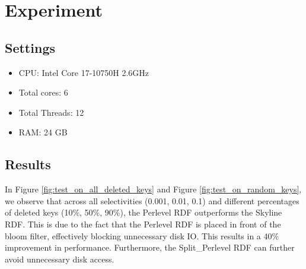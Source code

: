 \documentclass[sigconf]{acmart}
\begin{document}




  





\section{Experiment}
\subsection{Settings}
\begin{itemize}
    \item CPU: Intel Core 17-10750H 2.6GHz 
    \item Total cores: 6 
    \item Total Threads: 12
    \item RAM: 24 GB
\end{itemize}

\subsection{Results}


In Figure \ref{fig:test_on_all_deleted_keys} and Figure \ref{fig:test_on_random_keys}, we observe that across all selectivities (0.001, 0.01, 0.1) and different percentages of deleted keys (10\%, 50\%, 90\%), the Perlevel RDF outperforms the Skyline RDF. This is due to the fact that the Perlevel RDF is placed in front of the bloom filter, effectively blocking unnecessary disk IO. This results in a 40\% improvement in performance. Furthermore, the Split\_Perlevel RDF can further avoid unnecessary disk access.
\end{document}
